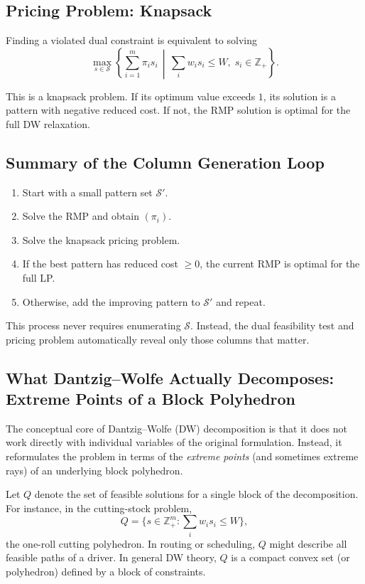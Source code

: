 \documentclass[11pt]{article}
\begin{document}
\subsection{Pricing Problem: Knapsack}

Finding a violated dual constraint is equivalent to solving
\[
    \max_{s\in\mathcal{S}}
        \left\{ \sum_{i=1}^m \pi_i s_i
        \,\middle|\,
        \sum_i w_i s_i \le W,\;
        s_i \in \mathbb{Z}_+ \right\}.
\]

This is a knapsack problem.
If its optimum value exceeds $1$, its solution is a pattern with negative
reduced cost.  
If not, the RMP solution is optimal for the full DW relaxation.

\subsection{Summary of the Column Generation Loop}

\begin{enumerate}
    \item Start with a small pattern set $\mathcal{S}'$.
    \item Solve the RMP and obtain $(\pi_i)$.
    \item Solve the knapsack pricing problem.
    \item If the best pattern has reduced cost $\ge 0$,
          the current RMP is optimal for the full LP.
    \item Otherwise, add the improving pattern to $\mathcal{S}'$ and repeat.
\end{enumerate}

This process never requires enumerating $\mathcal{S}$.
Instead, the dual feasibility test and pricing problem automatically reveal
only those columns that matter.

\subsection{What Dantzig--Wolfe Actually Decomposes: Extreme Points of a Block Polyhedron}

The conceptual core of Dantzig--Wolfe (DW) decomposition is that it does not
work directly with individual variables of the original formulation.
Instead, it reformulates the problem in terms of the \emph{extreme points}
(and sometimes extreme rays) of an underlying block polyhedron.

Let $Q$ denote the set of feasible solutions for a single block of the
decomposition.
For instance, in the cutting-stock problem,
\[
    Q = \{ s \in \mathbb{Z}_+^m : \sum_i w_i s_i \le W \},
\]
the one-roll cutting polyhedron.
In routing or scheduling, $Q$ might describe all feasible paths of a driver.
In general DW theory, $Q$ is a compact convex set (or polyhedron) defined by
a block of constraints.
\end{document}
